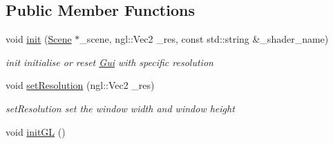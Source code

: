 \subsection*{Public Member Functions}
\begin{DoxyCompactItemize}
\item 
void \hyperlink{class_gui_ab494eaa66729e584466e0af49d38495d}{init} (\hyperlink{class_scene}{Scene} $\ast$\+\_\+scene, ngl\+::\+Vec2 \+\_\+res, const std\+::string \&\+\_\+shader\+\_\+name)
\begin{DoxyCompactList}\small\item\em init initialise or reset \hyperlink{class_gui}{Gui} with specific resolution \end{DoxyCompactList}\item 
\hypertarget{class_gui_a920c7449785d0e0647d097bb3c10ce00}{}void \hyperlink{class_gui_a920c7449785d0e0647d097bb3c10ce00}{set\+Resolution} (ngl\+::\+Vec2 \+\_\+res)\label{class_gui_a920c7449785d0e0647d097bb3c10ce00}

\begin{DoxyCompactList}\small\item\em set\+Resolution set the window width and window height \end{DoxyCompactList}\item 
\hypertarget{class_gui_a379674b073c95c007cab558fcc4f6211}{}void \hyperlink{class_gui_a379674b073c95c007cab558fcc4f6211}{init\+G\+L} ()\label{class_gui_a379674b073c95c007cab558fcc4f6211}


\end{DoxyCompactItemize}
